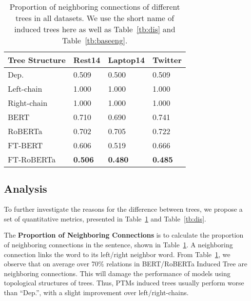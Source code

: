 \documentclass[11pt]{article}
\begin{document}
\begin{table}[h]
  \centering\small
  \setlength\tabcolsep{1pt}
  \begin{tabular}{m{2.5cm}m{1.5cm}<{\centering}m{2cm}<{\centering}m{1.3cm}<{\centering}}
    \toprule
    Tree Structure & Rest14         & Laptop14       & Twitter        \\
    \midrule
    Dep.           & 0.509          & 0.500          & 0.509          \\
    Left-chain     & 1.000          & 1.000          & 1.000          \\
    Right-chain    & 1.000          & 1.000          & 1.000          \\
    BERT           & 0.710          & 0.690          & 0.741          \\
    RoBERTa        & 0.702          & 0.705          & 0.722          \\
    FT-BERT        & 0.606          & 0.519          & 0.666          \\
    FT-RoBERTa     & \textbf{0.506} & \textbf{0.480} & \textbf{0.485} \\
    \bottomrule
  \end{tabular}
  \caption{Proportion of neighboring connections of different trees in all datasets. We use the short name of induced trees here as well as  Table~\ref{tb:dis} and Table~\ref{tb:baseeng}.}
  \label{tb:1hop}
\end{table}


\subsection{Analysis}
To  further investigate the reasons for the difference between trees, we  propose a set of quantitative metrics, presented in Table~\ref{tb:1hop} and Table~\ref{tb:dis}.







The \textbf{ Proportion of Neighboring Connections} is to calculate the proportion of neighboring connections in the sentence, shown in Table~\ref{tb:1hop}. A neighboring connection links the word to its left/right neighbor word. From Table~\ref{tb:1hop}, we observe that on average over 70\%  relations in BERT/RoBERTa Induced Tree are neighboring connections. This will damage the performance of models using topological structures of trees. Thus, PTMs induced trees usually perform worse than ``Dep.'', with a slight improvement over left/right-chains.
\end{document}
